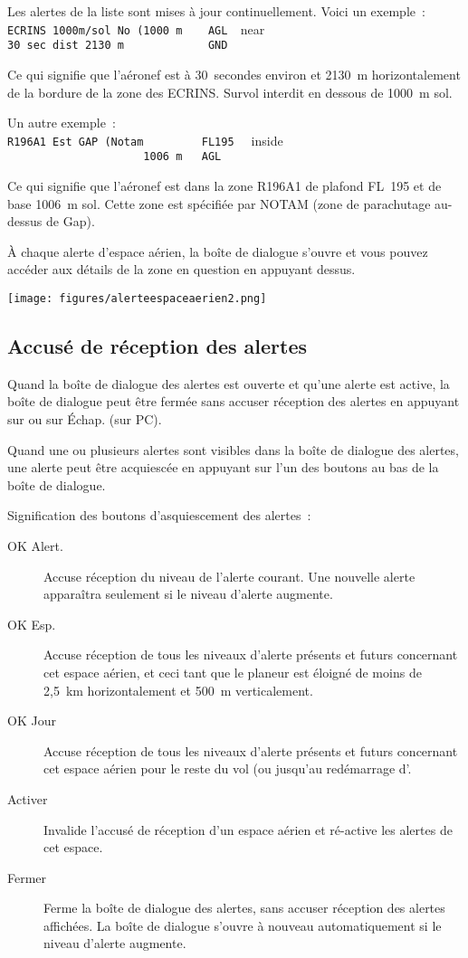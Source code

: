 Les alertes de la liste sont mises à jour continuellement.
Voici un exemple~:\\
\verb+ECRINS 1000m/sol No (1000 m    AGL  +\colorbox{AirspaceYellow}{near}\\
\verb+30 sec dist 2130 m             GND+

Ce qui signifie que l'aéronef est à 30~secondes environ et 2130~m horizontalement de la bordure de la zone des ECRINS. Survol interdit en dessous de 1000~m sol.

Un autre exemple~:\\
\verb+R196A1 Est GAP (Notam         FL195  + \colorbox{AirspaceRed}{inside}\\
\verb+                     1006 m   AGL+

Ce qui signifie que l'aéronef est dans la zone R196A1 de plafond FL~195 et de base 1006~m sol. Cette zone est spécifiée par NOTAM (zone de parachutage au-dessus de Gap).

À chaque alerte d'espace aérien, la boîte de dialogue s'ouvre et vous pouvez accéder aux détails de la zone en question en appuyant dessus.
\begin{center}
\texttt{[image: figures/alerteespaceaerien2.png]}
\end{center}


\subsection*{Accusé de réception des alertes}

Quand la boîte de dialogue des alertes est ouverte et qu'une alerte est active, la boîte de dialogue peut être fermée sans accuser réception des alertes en appuyant sur  ou sur Échap. (sur PC).

Quand une ou plusieurs alertes sont visibles dans la boîte de dialogue des alertes, une alerte peut être acquiescée en appuyant sur l'un des boutons au bas de la boîte de dialogue. 

Signification des boutons d'asquiescement des alertes~:
\begin{description}
\item[OK Alert.] Accuse réception du niveau de l'alerte courant. Une nouvelle alerte apparaîtra seulement si le niveau d'alerte augmente.
\item[OK Esp.] Accuse réception de tous les niveaux d'alerte présents et futurs concernant cet espace aérien, et ceci tant que le planeur est éloigné de moins de 2,5~km horizontalement et 500~m verticalement.
\item[OK Jour] Accuse réception de tous les niveaux d'alerte présents et futurs concernant cet espace aérien pour le reste du vol (ou jusqu'au redémarrage d'\xc.
\item[Activer] Invalide l'accusé de réception d'un espace aérien et ré-active les alertes de cet espace.
\item[Fermer] Ferme la boîte de dialogue des alertes, sans accuser réception des alertes affichées. La boîte de dialogue s'ouvre à nouveau automatiquement si le niveau d'alerte augmente.
\end{description}

